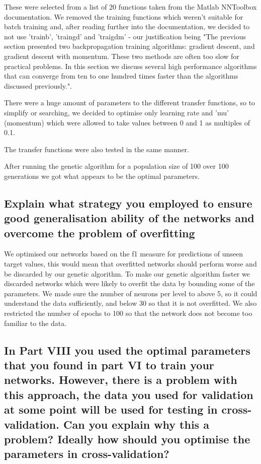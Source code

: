 \documentclass[11pt]{article}
\begin{document}
These were selected from a list of 20 functions taken from the Matlab NNToolbox documentation. We removed the training functions which weren't suitable for batch training and, after reading further into the documentation, we decided to not use 'trainb', 'traingd' and 'traigdm' - our justification being "The previous section presented two backpropagation training algorithms: gradient descent, and gradient descent with momentum. These two methods are often too slow for practical problems. In this section we discuss several high performance algorithms that can converge from ten to one hundred times faster than the algorithms discussed previously.".

There were a huge amount of parameters to the different transfer functions, so to simplify or searching, we decided to optimise only learning rate and 'mu' (momentum) which were allowed to take values between 0 and 1 as multiples of 0.1.

The transfer functions were also tested in the same manner.

After running the genetic algorithm for a population size of 100 over 100 generations we got 
what appears to be the optimal parameters.





\subsection{Explain what strategy you employed to ensure good generalisation ability of the networks and overcome the problem of overfitting}

We optimised our networks based on the f1 measure for predictions of unseen target values, this would mean that overfitted networks should perform worse and be discarded by our genetic algorithm. To make our genetic algorithm faster we discarded networks which were likely to overfit the data by bounding some of the parameters. We made sure the number of neurons per level to above 5, so it could understand the data sufficiently, and below 30 so that it is not overfitted. We also restricted the number of epochs to 100 so that the network does not become too familiar to the data. 

\subsection{In Part VIII you used the optimal parameters that you found in part VI to train your networks. However, there is a problem with this approach, the data you used for validation at some point will be used for testing in cross-validation. Can you explain why this a problem? Ideally how should you optimise the parameters in cross-validation?}
\end{document}
